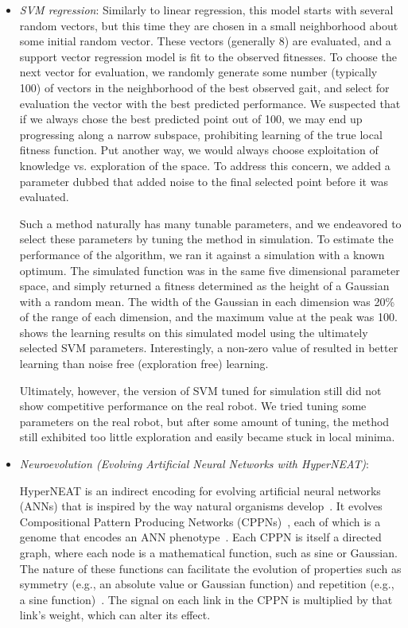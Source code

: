 \begin{itemize}
\item \emph{SVM regression}: Similarly to linear regression, this
  model starts with several random vectors, but this time they are
  chosen in a small neighborhood about some initial random vector.
  These vectors (generally 8) are evaluated, and a support vector
  regression model is fit to the observed fitnesses.  To choose the
  next vector for evaluation, we randomly generate some number
  (typically 100) of vectors in the neighborhood of the best observed
  gait, and select for evaluation the vector with the best predicted
  performance.  We suspected that if we always chose the best
  predicted point out of 100, we may end up progressing along a narrow
  subspace, prohibiting learning of the true local fitness function.
  Put another way, we would always choose exploitation of knowledge
  vs. exploration of the space.  To address this concern, we added a
  parameter dubbed  that added noise to the final
  selected point before it was evaluated.

  Such a method naturally has many tunable parameters, and we
  endeavored to select these parameters by tuning the method in
  simulation.  To estimate the performance of the algorithm, we ran it
  against a simulation with a known optimum.  The simulated function
  was in the same five dimensional parameter space, and simply
  returned a fitness determined as the height of a Gaussian with a
  random mean.  The width of the Gaussian in each dimension was 20\%
  of the range of each dimension, and the maximum value at the peak
  was 100.   shows the learning results on
  this simulated model using the ultimately selected SVM parameters.
  Interestingly, a non-zero value of  resulted in better
  learning than noise free (exploration free) learning.

  Ultimately, however, the version of SVM tuned for simulation still
  did not show competitive performance on the real robot.  We tried
  tuning some parameters on the real robot, but after some amount of
  tuning, the method still exhibited too little exploration and easily
  became stuck in local minima.

\item \emph{Neuroevolution (Evolving Artificial Neural Networks with HyperNEAT)}: 
    
HyperNEAT is an indirect encoding for evolving artificial neural
networks (ANNs) that is inspired by the way natural organisms
develop~\cite{stanley2009hypercube}. It evolves Compositional Pattern
Producing Networks (CPPNs)~\cite{stanley2007compositional}, each of
which is a genome that encodes an ANN
phenotype~\cite{stanley2009hypercube}. Each CPPN is itself a directed
graph, where each node is a mathematical function, such as sine or
Gaussian. The nature of these functions can facilitate the evolution
of properties such as symmetry (e.g., an absolute value or Gaussian
function) and repetition (e.g., a sine
function)~\cite{stanley2009hypercube, stanley2007compositional}. The
signal on each link in the CPPN is multiplied by that link's weight,
which can alter its effect.
  

\end{itemize}
